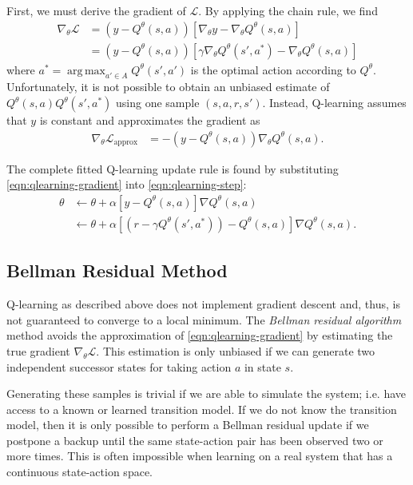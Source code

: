 \documentclass[11pt]{article}
\numberwithin{equation}{section}
\numberwithin{figure}{section}
\DeclareMathOperator*{\argmax}{arg\,max}
\begin{document}
First, we must derive the gradient of $\mathcal{L}$. By applying the chain
rule, we find
\begin{align*}
    \nabla_\theta \mathcal{L} &= \left(y - Q^\theta(s, a)\right) \left[
                                      \nabla_\theta y
                                    - \nabla_\theta Q^\theta(s, a) \right] \\
                              &= \left(y - Q^\theta(s, a)\right) \left[
                                      \gamma \nabla_\theta Q^\theta(s', a^*)
                                    - \nabla_\theta Q^\theta(s, a) \right]
\end{align*}
where $a^* = \argmax_{a' \in A} Q^\theta(s', a')$ is the optimal action according
to $Q^\theta$. Unfortunately, it is not possible to obtain an unbiased estimate
of $Q^\theta(s, a) Q^\theta(s', a^*)$ using one sample $(s, a, r, s')$. Instead,
Q-learning assumes that $y$ is constant and approximates the gradient as
\begin{align}
    \nabla_\theta \mathcal{L}_\text{approx} &= -\left(y - Q^\theta(s, a)\right)
                                       \nabla_\theta Q^\theta(s, a).
    \label{eqn:qlearning-gradient}
\end{align}

The complete fitted Q-learning update rule is found by substituting
\cref{eqn:qlearning-gradient} into \cref{eqn:qlearning-step}:
\begin{align*}
    \theta &\gets \theta + \alpha \left[y - Q^\theta(s, a)\right] 
                \nabla Q^\theta (s, a) \\
           &\gets \theta + \alpha \left[
                \left( r - \gamma Q^\theta(s', a^*) \right)
                - Q^\theta(s, a)\right] \nabla Q^\theta (s, a).
\end{align*}

\subsection{Bellman Residual Method}
Q-learning as described above does not implement gradient descent and, thus, is
not guaranteed to converge to a local minimum. The \emph{Bellman residual
algorithm} method avoids the approximation of \cref{eqn:qlearning-gradient} by
estimating the true gradient $\nabla_\theta \mathcal{L}$. This estimation is
only unbiased if we can generate two independent successor states for taking
action $a$ in state $s$.

Generating these samples is trivial if we are able to simulate the system; i.e.
have access to a known or learned transition model. If we do not know the
transition model, then it is only possible to perform a Bellman residual update
if we postpone a backup until the same state-action pair has been observed two
or more times. This is often impossible when learning on a real system that has
a continuous state-action space.
\end{document}
